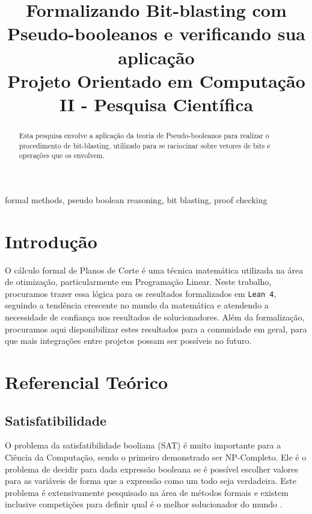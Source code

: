 \documentclass[conference]{IEEEtran}
\begin{document}
\title{Formalizando Bit-blasting com Pseudo-booleanos e verificando sua aplicação\\
{\footnotesize Projeto Orientado em Computação II - Pesquisa Científica}
}

\author{
}

\maketitle

\begin{abstract}
    Esta pesquisa envolve a aplicação da teoria de Pseudo-booleanos para realizar o procedimento de
    bit-blasting, utilizado para se raciocinar sobre vetores de bits e operações que os envolvem.
\end{abstract}

\begin{IEEEkeywords}
    formal methods, pseudo boolean reasoning, bit blasting, proof checking
\end{IEEEkeywords}

\section{Introdução}

O cálculo formal de Planos de Corte\cite{CutPlane} é uma técnica matemática utilizada na área de otimização,
particularmente em Programação Linear.
Neste trabalho, procuramos trazer essa lógica para os resultados formalizados em \texttt{Lean 4},
seguindo a tendência crescente no mundo da matemática e atendendo a necessidade de confiança
nos resultados de solucionadores. Além da formalização, procuramos aqui disponibilizar estes
resultados para a comunidade em geral, para que mais integrações entre projetos possam ser possíveis
no futuro.

\section{Referencial Teórico}

\subsection{Satisfatibilidade}
O problema da satisfatibilidade booliana (SAT) é muito importante para a Ciência da Computação, sendo o
primeiro demonstrado ser NP-Completo. Ele é o problema de decidir para dada expressão booleana
se é possível escolher valores para as variáveis de forma que a expressão como um todo seja verdadeira.
Este problema é extensivamente pesquisado na área de métodos formais\cite{SatLive} e existem inclusive competições para
definir qual é o melhor solucionador do mundo \cite{SatComp}.
\end{document}
